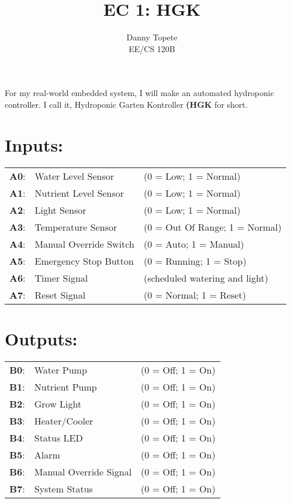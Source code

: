 \documentclass[12pt]{article}
\begin{document}
 
 
\title{EC 1: HGK}
\author{Danny Topete\\ %
EE/CS 120B}

\maketitle

\doublespacing
\begin{center}
For my real-world embedded system, I will make an automated hydroponic controller.
I call it, Hydroponic Garten Kontroller \textbf{(HGK} for short. 
\end{center}


\section{Inputs:}

\begin{tabular}{ l l l }
   \textbf{A0}: & Water Level Sensor & \quad (0 = Low; 1 = Normal) \\
   \textbf{A1}: & Nutrient Level Sensor & \quad (0 = Low; 1 = Normal) \\
   \textbf{A2}: & Light Sensor & \quad (0 = Low; 1 = Normal) \\
   \textbf{A3}: & Temperature Sensor & \quad (0 = Out Of Range; 1 = Normal) \\
   \textbf{A4}: & Manual Override Switch & \quad (0 = Auto; 1 = Manual) \\
   \textbf{A5}: & Emergency Stop Button & \quad (0 = Running; 1 = Stop) \\
   \textbf{A6}: & Timer Signal & \quad (scheduled watering and light) \\
   \textbf{A7}: & Reset Signal & \quad (0 = Normal; 1 = Reset) \\
\end{tabular}

\section{Outputs:}

\begin{tabular}{ l l l }

   \textbf{B0}: & Water Pump & \quad (0 = Off; 1 = On) \\
   \textbf{B1}: & Nutrient Pump & \quad (0 = Off; 1 = On) \\
   \textbf{B2}: & Grow Light & \quad (0 = Off; 1 = On) \\
   \textbf{B3}: & Heater/Cooler & \quad (0 = Off; 1 = On) \\
   \textbf{B4}: & Status LED & \quad (0 = Off; 1 = On) \\
   \textbf{B5}: & Alarm & \quad (0 = Off; 1 = On) \\
   \textbf{B6}: & Manual Override Signal & \quad (0 = Off; 1 = On) \\
   \textbf{B7}: & System Status & \quad (0 = Off; 1 = On) \\
\end{tabular}
\end{document}
